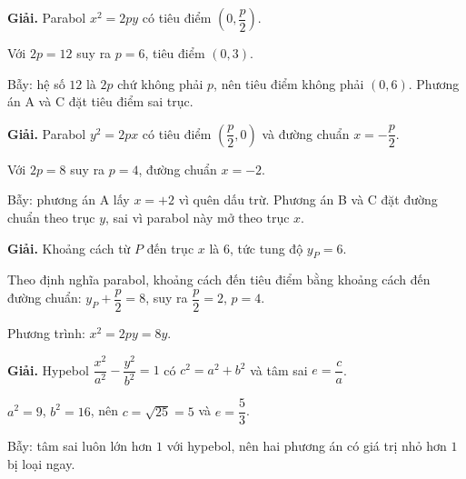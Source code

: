 \documentclass[11pt, a4paper]{article}
\begin{document}
\vspace{0.3cm}
\begin{dapan}[22 — Đáp án B]

\textbf{Giải.} Parabol $x^2 = 2py$ có tiêu điểm $\left(0, \dfrac{p}{2}\right)$.

Với $2p = 12$ suy ra $p = 6$, tiêu điểm $(0,3)$.

Bẫy: hệ số $12$ là $2p$ chứ không phải $p$, nên tiêu điểm không phải $(0,6)$. Phương án A và C đặt tiêu điểm sai trục.


\end{dapan}
\vspace{0.3cm}
\begin{dapan}[23 — Đáp án D]

\textbf{Giải.} Parabol $y^2 = 2px$ có tiêu điểm $\left(\dfrac{p}{2}, 0\right)$ và đường chuẩn $x = -\dfrac{p}{2}$.

Với $2p = 8$ suy ra $p = 4$, đường chuẩn $x = -2$.

Bẫy: phương án A lấy $x = +2$ vì quên dấu trừ. Phương án B và C đặt đường chuẩn theo trục $y$, sai vì parabol này mở theo trục $x$.


\end{dapan}
\vspace{0.3cm}
\begin{dapan}[24 — Đáp án C]

\textbf{Giải.} Khoảng cách từ $P$ đến trục $x$ là $6$, tức tung độ $y_P = 6$.

Theo định nghĩa parabol, khoảng cách đến tiêu điểm bằng khoảng cách đến đường chuẩn: $y_P + \dfrac{p}{2} = 8$, suy ra $\dfrac{p}{2} = 2$, $p = 4$.

Phương trình: $x^2 = 2py = 8y$.


\end{dapan}
\vspace{0.3cm}
\begin{dapan}[25 — Đáp án A]

\textbf{Giải.} Hypebol $\dfrac{x^2}{a^2} - \dfrac{y^2}{b^2} = 1$ có $c^2 = a^2 + b^2$ và tâm sai $e = \dfrac{c}{a}$.

$a^2 = 9$, $b^2 = 16$, nên $c = \sqrt{25} = 5$ và $e = \dfrac{5}{3}$.

Bẫy: tâm sai luôn lớn hơn $1$ với hypebol, nên hai phương án có giá trị nhỏ hơn $1$ bị loại ngay.


\end{dapan}
\vspace{0.3cm}
\end{document}

